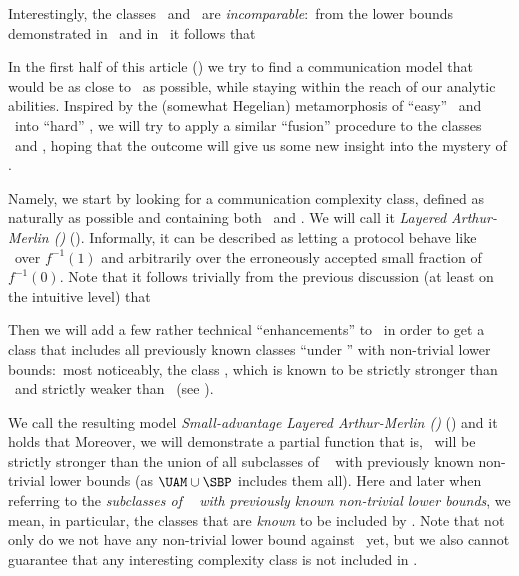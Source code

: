 Interestingly, the classes \MA\ and \UAM\ are \emph{incomparable}:\ from the lower bounds demonstrated in~\cite{GPW15_Zero} and in~\cite{GLMWZ16_Rec}
%
it follows that   %

In the first half of this %
article %
() we try to find a communication model that would be as close to \AM\ as possible, while staying within the reach of our analytic abilities.
Inspired by the (somewhat Hegelian) metamorphosis of ``easy'' \BPP\ and \NP\ into ``hard'' \AM, we will try to apply a similar ``fusion'' procedure to the classes \MA\ and \UAM, hoping that the outcome will give us some new insight into the mystery of \AM.

Namely, we start by looking for a communication complexity class, defined as naturally as possible and containing both \MA\ and \UAM.
We will call it \emph{Layered Arthur-Merlin (\LAM)} ().
Informally, it can be described as letting a protocol behave like \MA\ over $f^{-1}(1)$ and arbitrarily over the erroneously accepted small fraction of $f^{-1}(0)$.
Note that it follows trivially from the previous discussion (at least on the intuitive level) that

Then we will add a few rather technical ``enhancements'' to \LAM\ in order to get a class that includes all previously known classes ``under \AM'' with non-trivial lower bounds:\ most noticeably, the class \SBP, which is known to be strictly stronger than \MA\ and strictly weaker than \AM\ (see \cite{GPW18_The, GLMWZ16_Rec, K11_On}).  %
%

We call the resulting model \emph{Small-advantage Layered Arthur-Merlin (\SLAM)} () and it holds that
Moreover, we will demonstrate a partial function
that is, \SLAM\ will be strictly stronger than the union of all
%
subclasses of \AM\  %
with previously known non-trivial lower bounds (as $\UAM\cup\SBP$ includes them all).\fn
{
Here and later when referring to the
%
\emph{subclasses of \AM\    %
  with previously known non-trivial lower bounds},%
%
we mean, in particular, the classes that are \emph{known} to be included by \AM.
Note that not only do we  
not have any non-trivial lower bound against \AM\ yet,  
but we also cannot guarantee that any interesting complexity class is not included in \AM.
}

%
%
%

